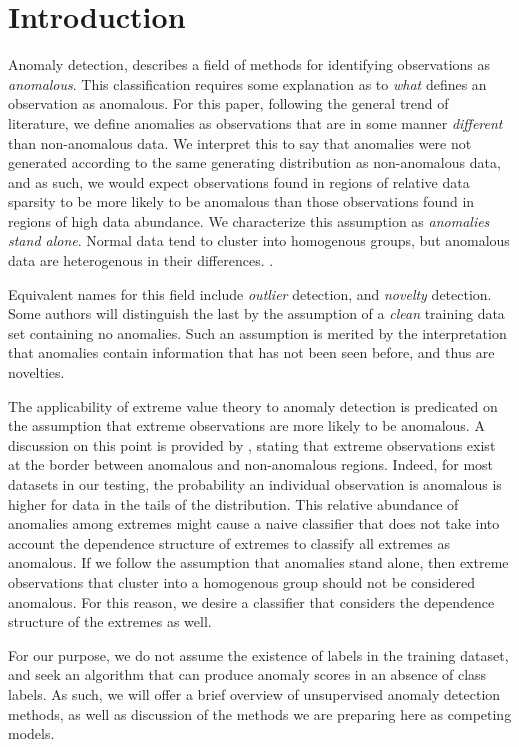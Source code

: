 \section{Introduction}

Anomaly detection, describes a field of methods for identifying observations as 
    \emph{anomalous}. This classification requires some explanation as to 
    \emph{what} defines an observation as anomalous. For this paper, following 
    the general trend of literature, we define anomalies as observations that 
    are in some manner \emph{different} than non-anomalous data. We interpret 
    this to say that anomalies were not generated according to the same 
    generating distribution as non-anomalous data, and as such, we would expect 
    observations found in regions of relative data sparsity to be more likely to 
    be anomalous than those observations found in regions of high data 
    abundance.  We characterize this assumption as \emph{anomalies stand alone}.  
    Normal data tend to cluster into homogenous groups, but anomalous data are 
    heterogenous in their differences. 
      .

Equivalent names for this field include \emph{outlier} detection, and 
    \emph{novelty} detection.  Some authors will distinguish the last by the 
    assumption of a \emph{clean} training data set containing no anomalies.
    Such an assumption is merited by the interpretation that anomalies contain 
    information that has not been seen before, and thus are novelties.

The applicability of extreme value theory to anomaly detection is predicated on 
    the assumption that extreme observations are more likely to be anomalous.  
    A discussion on this point is provided by \cite{goix2017}, stating that 
    extreme observations exist at the border between anomalous and non-anomalous 
    regions.  Indeed, for most datasets in our testing, the probability an 
    individual observation is anomalous is higher for data in the tails of the 
    distribution. This relative abundance of anomalies among extremes might 
    cause a naive classifier that does not take into account the dependence 
    structure of extremes to classify all extremes as anomalous.  If we follow 
    the assumption that anomalies stand alone, then extreme observations that 
    cluster into a homogenous group should not be considered anomalous.  For 
    this reason, we desire a classifier that considers the dependence structure 
    of the extremes as well.

For our purpose, we do not assume the existence of labels in the training 
    dataset, and seek an algorithm that can produce anomaly scores in an absence 
    of class labels. As such, we will offer a brief overview of unsupervised 
    anomaly detection methods, as well as discussion of the methods we are 
    preparing here as competing models.







